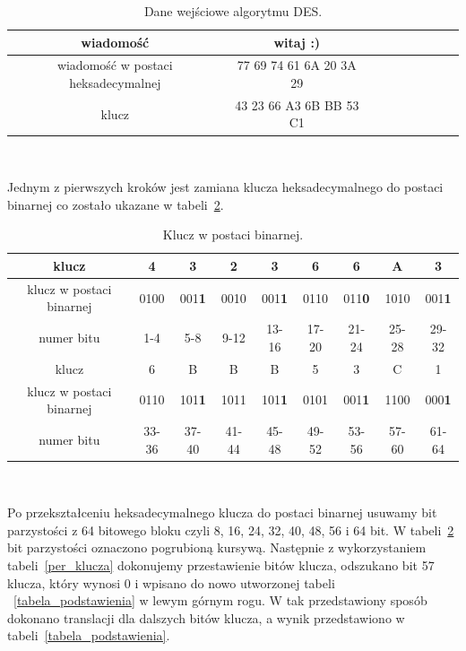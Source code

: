 \documentclass[12p]{article}
\begin{document}
\begin{table}[H]
\centering
\begin{tabular}{|c|c|c|c|c|c|c|c|c|}
\hline
wiadomość & witaj :)\\
\hline
wiadomość w postaci heksadecymalnej & 77 69 74 61 6A 20 3A 29\\
\hline
klucz & 43 23 66 A3 6B BB 53 C1\\
\hline
\end{tabular}
\caption{Dane wejściowe algorytmu DES.}~\label{binary}
\end{table}

Jednym z pierwszych kroków jest zamiana klucza heksadecymalnego do postaci binarnej co zostało ukazane w tabeli~\ref{klucz_to_binary}.


\begin{table}[H]
\centering
\begin{tabular}{|c|c|c|c|c|c|c|c|c|}
\hline
klucz & 4 & 3 & 2 & 3 & 6 & 6 & A & 3\\
\hline
klucz w postaci binarnej & 0100 & 001\textbf{1} & 0010 & 001\textbf{1} & 0110 & 011\textbf{0} & 1010 & 001\textbf{1}\\ 
\hline
numer bitu & 1-4 & 5-8 & 9-12 & 13-16 & 17-20 & 21-24 & 25-28 & 29-32\\
\hline
\hline
klucz & 6 & B & B & B & 5 & 3 & C & 1\\
\hline
klucz w postaci binarnej & 0110 & 101\textbf{1} & 1011 & 101\textbf{1} & 0101 & 001\textbf{1} & 1100 & 000\textbf{1}\\
\hline
numer bitu & 33-36 & 37-40 & 41-44 & 45-48 & 49-52 & 53-56 & 57-60 & 61-64\\
\hline
\end{tabular}
\caption{Klucz w postaci binarnej.}~\label{klucz_to_binary}
\end{table}

Po przekształceniu heksadecymalnego klucza do postaci binarnej usuwamy bit parzystości z 64 bitowego bloku czyli 8, 16, 24, 32, 40, 48, 56 i 64 bit. W tabeli~\ref{klucz_to_binary} bit parzystości oznaczono pogrubioną kursywą. Następnie z wykorzystaniem tabeli~\ref{per_klucza} dokonujemy przestawienie bitów klucza, odszukano bit 57 klucza, który wynosi 0 i wpisano do nowo utworzonej tabeli ~\ref{tabela_podstawienia} w lewym górnym rogu. W tak przedstawiony sposób dokonano translacji dla dalszych bitów klucza, a wynik przedstawiono w tabeli~\ref{tabela_podstawienia}.
\end{document}

